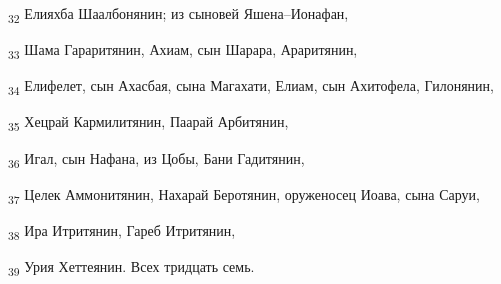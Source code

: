 \begin{tcolorbox}
\textsubscript{32} Елияхба Шаалбонянин; из сыновей Яшена--Ионафан,
\end{tcolorbox}
\begin{tcolorbox}
\textsubscript{33} Шама Гараритянин, Ахиам, сын Шарара, Араритянин,
\end{tcolorbox}
\begin{tcolorbox}
\textsubscript{34} Елифелет, сын Ахасбая, сына Магахати, Елиам, сын Ахитофела, Гилонянин,
\end{tcolorbox}
\begin{tcolorbox}
\textsubscript{35} Хецрай Кармилитянин, Паарай Арбитянин,
\end{tcolorbox}
\begin{tcolorbox}
\textsubscript{36} Игал, сын Нафана, из Цобы, Бани Гадитянин,
\end{tcolorbox}
\begin{tcolorbox}
\textsubscript{37} Целек Аммонитянин, Нахарай Беротянин, оруженосец Иоава, сына Саруи,
\end{tcolorbox}
\begin{tcolorbox}
\textsubscript{38} Ира Итритянин, Гареб Итритянин,
\end{tcolorbox}
\begin{tcolorbox}
\textsubscript{39} Урия Хеттеянин. Всех тридцать семь.
\end{tcolorbox}
